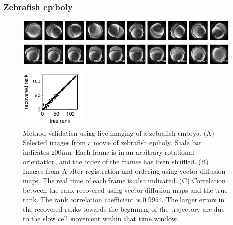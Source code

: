\documentclass[twocolumn, 10pt]{article}
\begin{document}
\subsubsection*{Zebrafish epiboly}

\begin{figure}[t]
\begin{minipage}[c]{13.75cm}
\vspace{0cm}
\includegraphics[width=13cm]{zebrafish_scrambled}

\includegraphics[width=13cm]{zebrafish_ordered}
\end{minipage}
%
\hfill
%
\begin{minipage}[c]{3.75cm}

\vspace{0cm}
%
\includegraphics[width=3.25cm]{zebrafish_rank_corr}
\end{minipage}
\caption{Method validation using live imaging of a zebrafish embryo. (A) Selected images from a movie of zebrafish epiboly. Scale bar indicates 200$\mu$m. Each frame is in an arbitrary rotational orientation, and the order of the frames has been shuffled. (B) Images from A after registration and ordering using vector diffusion maps. The real time of each frame is also indicated. (C) Correlation between the rank recovered using vector diffusion maps and the true rank.  The rank correlation coefficient is $0.9954$. The larger errors in the recovered ranks towards the beginning of the trajectory are due to the slow cell movement within that time window. }
\label{fig:zebrafish}
\end{figure}
\end{document}
